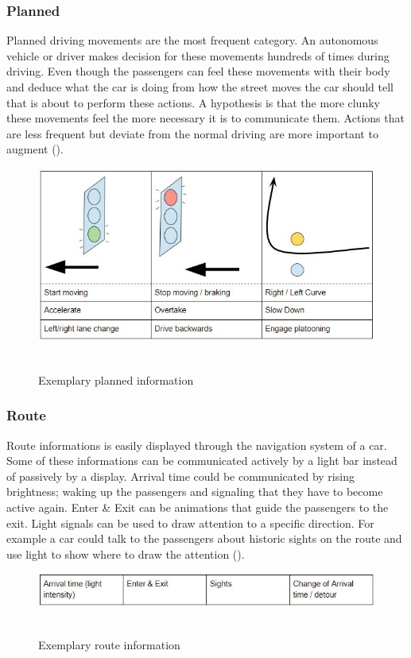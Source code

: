 \subsubsection{Planned}
Planned driving movements are the most frequent category. An autonomous vehicle or driver makes decision for these movements hundreds of times during driving. Even though the passengers can feel these movements with their body and deduce what the car is doing from how the street moves the car should tell that is about to perform these actions. A hypothesis is that the more clunky these movements feel the more necessary it is to communicate them. Actions that are less frequent but deviate from the normal driving are more important to augment (). 
\begin{figure}
    \includegraphics[width=1\textwidth]{fig/planned.JPG}\hfill\
    \caption[Planned information]{Exemplary planned information}
    \label{fig:planned}
\end{figure}

\subsubsection{Route}
Route informations is easily displayed through the navigation system of a car. Some of these informations can be communicated actively by a light bar instead of passively by a display. Arrival time could be communicated by rising brightness; waking up the passengers and signaling that they have to become active again. Enter \& Exit can be animations that guide the passengers to the exit. Light signals can be used to draw attention to a specific direction. For example a car could talk to the passengers about historic sights on the route and use light to show where to draw the attention (). 
\begin{figure}
    \includegraphics[width=1\textwidth]{fig/route.JPG}\hfill\
    \caption[Route information]{Exemplary route information}
    \label{fig:route}
\end{figure}

